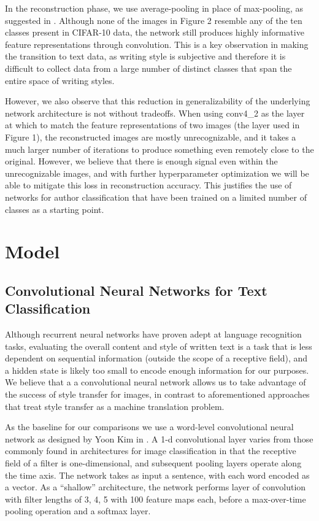 \documentclass{vldb}
\begin{document}
In the reconstruction phase, we use average-pooling in place of max-pooling, as suggested in \cite{GatysEB15a}. Although none of the images in Figure 2 resemble any of the ten classes present in CIFAR-10 data, the network still produces highly informative feature representations through convolution. This is a key observation in making the transition to text data, as writing style is subjective and therefore it is difficult to collect data from a large number of distinct classes that span the entire space of writing styles. 

However, we also observe that this reduction in generalizability of the underlying network architecture is not without tradeoffs. When using conv4\_2 as the layer at which to match the feature representations of two images (the layer used in Figure 1), the reconstructed images are mostly unrecognizable, and it takes a much larger number of iterations to produce something even remotely close to the original. However, we believe that there is enough signal even within the unrecognizable images, and with further hyperparameter optimization we will be able to mitigate this loss in reconstruction accuracy. This justifies the use of networks for author classification that have been trained on a limited number of classes as a starting point.

\section{Model}
\subsection{Convolutional Neural Networks for Text Classification}
Although recurrent neural networks have proven adept at language recognition tasks, evaluating the overall content and style of written text is a task that is less dependent on sequential information (outside the scope of a receptive field), and a hidden state is likely too small to encode enough information for our purposes. We believe that a a convolutional neural network allows us to take advantage of the success of style transfer for images, in contrast to aforementioned approaches that treat style transfer as a machine translation problem.

As the baseline for our comparisons we use a word-level convolutional neural network as designed by Yoon Kim in \cite{Kim14f}. A 1-d convolutional layer varies from those commonly found in architectures for image classification in that the receptive field of a filter is one-dimensional, and subsequent pooling layers operate along the time axis. The network takes as input a sentence, with each word encoded as a vector. As a ``shallow'' architecture, the network performs layer of convolution with filter lengths of 3, 4, 5 with 100 feature maps each, before a max-over-time pooling operation and a softmax layer. 
\end{document}
